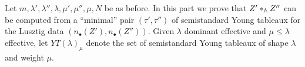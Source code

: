 \documentclass[draft]{article}
\begin{document}
\begin{comment}
\begin{lemma}%
    Let $\mu',\mu''$ be dominant and let $s\in \AA^1 - \{0\}$. Then 
    \begin{equation}
        S_{\mu',\mu''}^s \subset \cW_\mu 
    \end{equation}
    where $\mu = \mu_1 + \mu_2$.
\end{lemma}

\begin{proof}
    We have
\[
\begin{split}
    S_{\mu_1, \mu_2} & = N\xT[t^{-1}]t^{\mu_1}(t-s)^{\mu_2} \\
     & \subset T_1\xt[t^{-1}] N\xT[t^{-1}] t^{\mu_1} (t-s)^{\mu_2} \\
     & = T_1\xt[t^{-1}] N_1\xt[t^{-1}] t^{\mu_1} (t-s)^{\mu_2} \qquad \text{\cite[Lemma 2.3]{kamnitzer2014yangians}}\\
     & = B_1\xt[t^{-1}] t^{\mu_1} (t-s)^{\mu_2} \\
     & = B_1\xt[t^{-1}] t^{\mu_1 + \mu_2} \\
     & \subset G_1\xt[t^{-1}] t^{\mu_1 + \mu_2} \\
     & = W_{\mu_1 + \mu_2}
\end{split}
\]
where $B_1\xt[t^{-1}] t^{\mu_1} (t-s)^{\mu_2} = B_1\xt[t^{-1}] t^{\mu_1 + \mu_2}$ since 
\[
\frac{t}{t-s} = 
1 + \frac{s}{t} + \frac{s^2}{t^2} + \cdots 
\in B_1\xt[t^{-1}].
\]
\end{proof}
\end{comment}
% 
% 
Let $m,\lambda',\lambda'',\lambda,\mu',\mu'',\mu,N$ be as before.
% 
In this part we prove that 
$Z'\ast_\AA Z''$ can be computed from a ``minimal'' pair $(\tau',\tau'')$ of semistandard Young tableaux for the Lusztig data  $(n_\bullet(Z'),n_\bullet(Z''))$.
% 
Given $\lambda$ dominant effective and $\mu\le\lambda$ effective, let $YT(\lambda)_\mu$ denote the set of semistandard Young tableaux of shape $\lambda$ and weight $\mu$. 
% 
\end{document}
